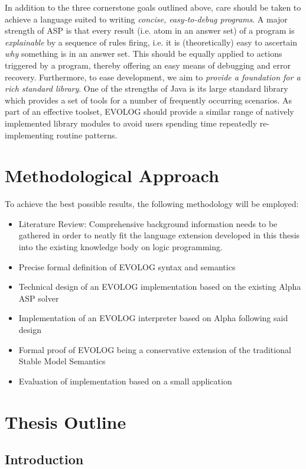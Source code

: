 \documentclass[12pt, letterpaper, twoside]{scrartcl}
\begin{document}
In addition to the three cornerstone goals outlined above, care should be taken to achieve a language suited to writing \emph{concise, easy-to-debug programs}. A major strength of ASP is that every result (i.e. atom in an answer set) of a program is \emph{explainable} by a sequence of rules firing, i.e. it is (theoretically) easy to ascertain \emph{why} something is in an answer set. This should be equally applied to actions triggered by a program, thereby offering an easy means of debugging and error recovery. Furthermore, to ease development, we aim to \emph{provide a foundation for a rich standard library}. One of the strengths of Java is its large standard library which provides a set of tools for a number of frequently occurring scenarios. As part of an effective toolset, EVOLOG should provide a similar range of natively implemented library modules to avoid users spending time repeatedly re-implementing routine patterns.

\section{Methodological Approach}
\label{sec:methodology}

To achieve the best possible results, the following methodology will be employed:
\begin{itemize}
\item Literature Review: Comprehensive background information needs to be gathered in order to neatly fit the language extension developed in this thesis into the existing knowledge body on logic programming.
\item Precise formal definition of EVOLOG syntax and semantics
\item Technical design of an EVOLOG implementation based on the existing Alpha ASP solver
\item Implementation of an EVOLOG interpreter based on Alpha following said design
\item Formal proof of EVOLOG being a conservative extension of the traditional Stable Model Semantics
\item Evaluation of implementation based on a small application
\end{itemize}

\section{Thesis Outline}
\label{sec:outline}

\subsection{Introduction}
\end{document}
